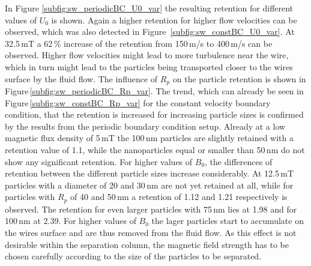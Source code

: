 In Figure \ref{subfig:sw_periodicBC_U0_var} the resulting retention for different values of  $U_{0}$ is shown. Again a higher retention for higher flow velocities can be observed, which was also detected in Figure \,\ref{subfig:sw_constBC_U0_var}. At 32.5\,mT a 62\,\% increase of the retention from 150\,\textmu m/s to 400\,\textmu m/s can be observed. Higher flow velocities might lead to more turbulence near the wire, which in turn might lead to the particles being transported closer to the wires surface by the fluid flow. The influence of $R_{p}$ on the particle retention is shown in Figure\,\ref{subfig:sw_periodicBC_Rp_var}. The trend, which can already be seen in Figure\,\ref{subfig:sw_constBC_Rp_var} for the constant velocity boundary condition, that the retention is increased for increasing particle sizes is confirmed by the results from the periodic boundary condition setup. Already at a low magnetic flux density of 5\,mT the 100\,nm particles are slightly retained with a retention value of 1.1, while the nanoparticles equal or smaller than 50\,nm do not show any significant retention. For higher values of $B_{0}$, the differences of retention between the different particle sizes increase considerably. At 12.5\,mT particles with a diameter of 20 and 30\,nm are not yet retained at all, while for particles with $R_{p}$ of 40 and 50\,nm a retention of 1.12 and 1.21 respectively is observed. The retention for even larger particles with 75\,nm lies at 1.98 and for 100\,nm at 2.39. For higher values of $B_{0}$ the lager particles start to accumulate on the wires surface and are thus removed from the fluid flow. As this effect is not desirable within the separation column, the magnetic field strength has to be chosen carefully according to the size of the particles to be separated.

